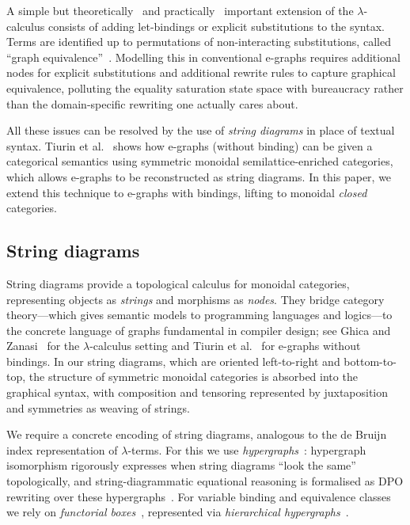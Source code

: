 A simple but theoretically~\cite{AbadiExplicitSubst} and practically~\cite{anf} important extension of the $\lambda$-calculus consists of adding let-bindings or explicit substitutions to the syntax.
Terms are identified up to permutations of non-interacting substitutions, called \enquote{graph equivalence}~\cite{accattoli2014nonstandard}.
Modelling this in conventional e-graphs requires additional nodes for explicit substitutions and additional rewrite rules to capture graphical equivalence, polluting the equality saturation state space with bureaucracy rather than the domain-specific rewriting one actually cares about.

All these issues can be resolved by the use of \emph{string diagrams} in place of textual syntax.
Tiurin et al.~\cite{tiurin2025equivalencehypergraphsdporewriting} shows how e-graphs (without binding) can be given a categorical semantics using symmetric monoidal semilattice-enriched categories, which allows e-graphs to be reconstructed as string diagrams.
In this paper, we extend this technique to e-graphs with bindings, lifting to monoidal \emph{closed} categories.

\subsection{String diagrams}

String diagrams provide a topological calculus for monoidal categories, representing objects as \emph{strings} and morphisms as \emph{nodes}.
They bridge category theory---which gives semantic models to programming languages and logics---to the concrete language of graphs fundamental in compiler design; see Ghica and Zanasi~\cite{ghica2024stringdiagramslambdacalculifunctional} for the $\lambda$-calculus setting and Tiurin et al.~\cite{tiurin2025equivalencehypergraphsdporewriting} for e-graphs without bindings.
In our string diagrams, which are oriented left-to-right and bottom-to-top, the structure of symmetric monoidal categories is absorbed into the graphical syntax, with composition and tensoring represented by juxtaposition and symmetries as weaving of strings.

We require a concrete encoding of string diagrams, analogous to the de Bruijn index representation of $\lambda$-terms.
For this we use \emph{hypergraphs}~\cite{bonchi_string_2022-1}: hypergraph isomorphism rigorously expresses when string diagrams \enquote{look the same} topologically, and string-diagrammatic equational reasoning is formalised as DPO rewriting over these hypergraphs~\cite{bonchi_string_2022-1}.
For variable binding and equivalence classes we rely on \emph{functorial boxes}~\cite{10.1007/11874683_1}, represented via \emph{hierarchical hypergraphs}~\cite{fscd}.

